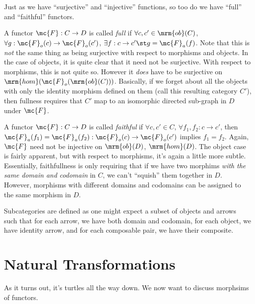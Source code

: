 \documentclass{fkbook}
\newcommand{\ob}{\mrm{ob}}
\newcommand{\homm}{\mrm{hom}}
\begin{document}
Just as we have ``surjective'' and ``injective'' functions, so too do
we have ``full'' and ``faithful'' functors.\\

\begin{definition}
  A functor $\mc{F} : C \to D$ is called \emph{full} if $\forall c,c'
  \in \ob(C)$, $\forall g : \mc{F}_o(c) \to \mc{F}_o(c')$, $\exists f
  : c \to c' \st g = \mc{F}_a(f)$. Note that this is \emph{not} the
  same thing as being surjective with respect to morphisms and
  objects. In the case of objects, it is quite clear that it need not
  be surjective. With respect to morphisms, this is not quite so.
  However it \emph{does} have to be surjective on
  $\homm(\mc{F}_o(\ob(C)))$. Basically, if we forget about all the
  objects with only the identity morphism defined on them (call this
  resulting category $C'$), then fullness requires that $C'$ map to an
  isomorphic directed sub-graph in $D$ under $\mc{F}$.\\
\end{definition}

\begin{definition}
  A functor $\mc{F} : C \to D$ is called \emph{faithful} if $\forall
  c, c' \in C$, $\forall f_1, f_2 : c \to c'$, then $\mc{F}_a(f_1) =
  \mc{F}_a(f_2) : \mc{F}_o(c) \to \mc{F}_o(c')$ implies $f_1 = f_2$.
  Again, $\mc{F}$ need not be injective on $\ob(D)$, $\homm(D)$. The
  object case is fairly apparent, but with respect to morphisms, it's
  again a little more subtle. Essentially, faithfullness is only
  requiring that if we have two morphims \emph{with the same domain
    and codomain} in $C$, we can't ``squish'' them together in $D$.
  However, morphisms with different domains and codomains can be
  assigned to the same morphism in $D$.
\end{definition}

\begin{definition}
  Subcategories are defined as one might expect a subset of objects
  and arrows such that for each arrow, we have both domain and
  codomain, for each object, we have identity arrow, and for each
  composable pair, we have their composite.
\end{definition}

\section{Natural Transformations}
As it turns out, it's turtles all the way down. We now want to discuss
morphsims of functors.
\end{document}
